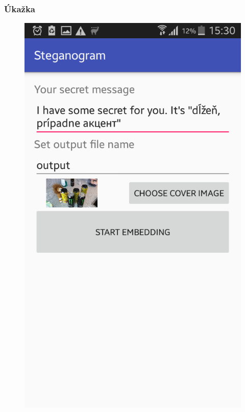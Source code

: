 \documentclass{beamer}
\begin{document}
\begin{frame}
    \frametitle{Úkažka}
    \begin{figure}
    \centerline{\includegraphics[height=0.8 \textheight]{images/screen_5.png}}
    
    \end{figure}
\end{frame}
\end{document}
